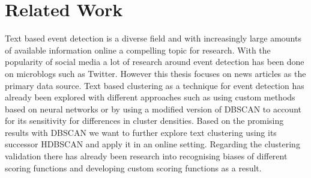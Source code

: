 \section{Related Work}

Text based event detection is a diverse field and with increasingly large amounts of available information online a compelling topic for research.
With the popularity of social media a lot of research around event detection has been done on microblogs\cite{microblog_clustering} such as Twitter\cite{twitter_survey}\cite{social_media_survey}.
However this thesis focuses on news articles as the primary data source.
Text based clustering as a technique for event detection has already been explored with different approaches such as using custom methods based on neural networks\cite{text_clustering_topic_detection}
or by using a modified version of DBSCAN to account for its sensitivity for differences in cluster densities\cite{dbscan_martingale}.
Based on the promising results with DBSCAN we want to further explore text clustering using its successor HDBSCAN\cite{McInnes2017} and apply it in an online setting.
Regarding the clustering validation there has already been research into recognising biases of different scoring functions \cite{Wu:2009:ARM:1557019.1557115}
and developing custom scoring functions as a result\cite{gates2017comparing}.
